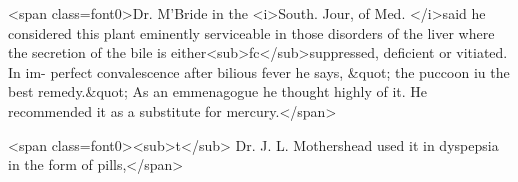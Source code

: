 <span class=font0>Dr. M'Bride in the <i>South. Jour, of Med. </i>said he considered this
plant eminently serviceable in those disorders of the liver where the
secretion of the bile is either<sub>fc</sub>suppressed, deficient or vitiated. In im-
perfect convalescence after bilious fever he says, &quot; the puccoon iu the
best remedy.&quot; As an emmenagogue he thought highly of it. He
recommended it as a substitute for mercury.</span>

<span class=font0><sub>t</sub> Dr. J. L. Mothershead used it in dyspepsia in the form of pills,</span>
